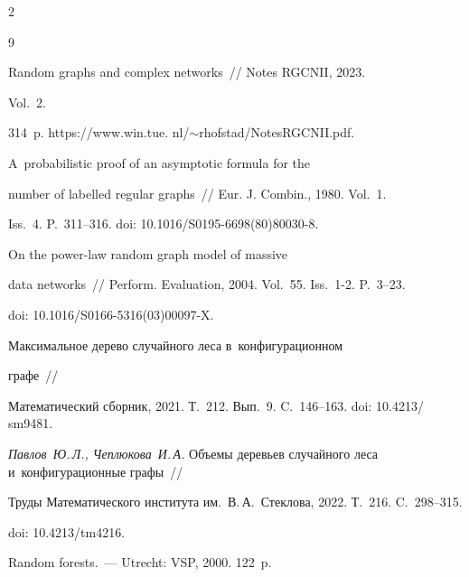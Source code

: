 \begin{multicols}{2}
{{\begin{thebibliography}{9}


 Random graphs and complex networks~// Notes RGCNII, 2023. 


Vol.~2.


314~p. {\sf https://www.win.tue. nl/$\sim$rhofstad/NotesRGCNII.pdf.}













 A~probabilistic proof of an asymptotic formula for the 


number of labelled regular graphs~// Eur. J. Combin., 1980. Vol.~1.


Iss.~4. P.~311--316. doi: 10.1016/S0195-6698(80)80030-8.







 On the power-law random graph model of massive


data networks~// Perform. Evaluation, 2004. Vol.~55. Iss.~1-2. P.~3--23.


doi: 10.1016/S0166-5316(03)00097-X.







 Максимальное дерево случайного леса в~конфигурационном 


графе~//


Математический сборник, 2021. Т.~212. Вып.~9. C.~146--163. doi: 10.4213/ sm9481.







\textit{Павлов~Ю.\,Л., Чеплюкова~И.\,А.} Объемы деревьев случайного леса и~конфигурационные графы~//


Труды Математического института им.~В.\,А.~Стеклова, 2022. Т.~216. C.~298--315. 


doi: 10.4213/tm4216.







 Random forests.~--- Utrecht: VSP, 2000. 122~p.





\end{thebibliography}





 }


 }





\end{multicols}





